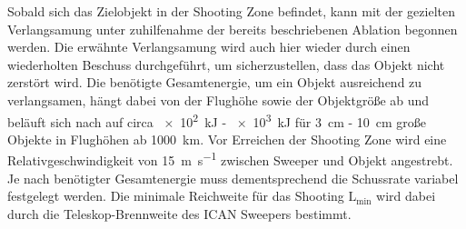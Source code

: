 \documentclass{article}
\begin{document}
\noindent Sobald sich das Zielobjekt in der Shooting Zone befindet, kann mit der gezielten Verlangsamung unter zuhilfenahme der bereits beschriebenen Ablation begonnen werden. Die erwähnte Verlangsamung wird auch hier wieder durch einen wiederholten Beschuss durchgeführt, um sicherzustellen, dass das Objekt nicht zerstört wird. Die benötigte Gesamtenergie, um ein Objekt ausreichend zu verlangsamen, hängt dabei von der Flughöhe sowie der Objektgröße ab und beläuft sich nach \cite{soulard2014ican} auf circa \SI{e2}{\kilo\joule} - \SI{e3}{\kilo\joule} für \SI{3}{\centi\meter} - \SI{10}{\centi\meter} große Objekte in Flughöhen ab \SI{1000}{\kilo\meter}. Vor Erreichen der Shooting Zone wird eine Relativgeschwindigkeit von \SI{15}{\meter\per\second} zwischen Sweeper und Objekt angestrebt. Je nach benötigter Gesamtenergie muss dementsprechend die Schussrate variabel festgelegt werden.  Die minimale Reichweite für das Shooting $\mathrm{L_{min}}$ wird dabei durch die Teleskop-Brennweite des ICAN Sweepers bestimmt. 
\end{document}
